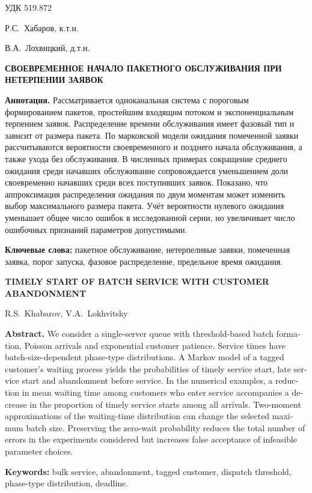 \noindent УДК 519.872

\bigskip
\noindent Р.С.~Хабаров, к.т.н.\par
\noindent В.А.~Лохвицкий, д.т.н.

\begin{center}
{\large\bfseries СВОЕВРЕМЕННОЕ НАЧАЛО ПАКЕТНОГО ОБСЛУЖИВАНИЯ ПРИ НЕТЕРПЕНИИ ЗАЯВОК}
\end{center}

\noindent\textbf{Аннотация.}
Рассматривается одноканальная система с пороговым формированием пакетов, простейшим входящим потоком и экспоненциальным терпением заявок. Распределение времени обслуживания имеет фазовый тип и зависит от размера пакета. По марковской модели ожидания помеченной заявки рассчитываются вероятности своевременного и позднего начала обслуживания, а также ухода без обслуживания. В численных примерах сокращение среднего ожидания среди начавших обслуживание сопровождается уменьшением доли своевременно начавших среди всех поступивших заявок. Показано, что аппроксимация распределения ожидания по двум моментам может изменить выбор максимального размера пакета. Учёт вероятности нулевого ожидания уменьшает общее число ошибок в исследованной серии, но увеличивает число ошибочных признаний параметров допустимыми.

\medskip
\noindent\textbf{Ключевые слова:} пакетное обслуживание, нетерпеливые заявки, помеченная заявка, порог запуска, фазовое распределение, предельное время ожидания.

\begin{center}
\textbf{TIMELY START OF BATCH SERVICE WITH CUSTOMER ABANDONMENT}

R.S.~Khabarov, V.A.~Lokhvitsky
\end{center}

\begin{otherlanguage}{english}
\noindent\textbf{Abstract.}
We consider a single-server queue with threshold-based batch formation, Poisson arrivals and exponential customer patience. Service times have batch-size-dependent phase-type distributions. A Markov model of a tagged customer's waiting process yields the probabilities of timely service start, late service start and abandonment before service. In the numerical examples, a reduction in mean waiting time among customers who enter service accompanies a decrease in the proportion of timely service starts among all arrivals. Two-moment approximations of the waiting-time distribution can change the selected maximum batch size. Preserving the zero-wait probability reduces the total number of errors in the experiments considered but increases false acceptance of infeasible parameter choices.

\medskip
\noindent\textbf{Keywords:} bulk service, abandonment, tagged customer, dispatch threshold, phase-type distribution, deadline.
\end{otherlanguage}

